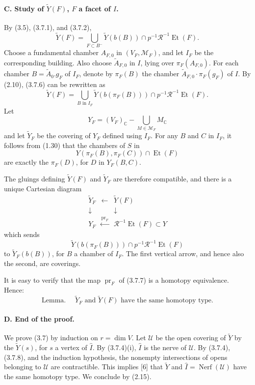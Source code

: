\documentclass[10pt]{article}
\newcommand{\C}{\mathbb C}
\begin{document}
\paragraph{C. Study of \(\widetilde Y(F)\), \(F\) a facet of \(I\).} By (3.5), (3.7.1), and (3.7.2),
\[
\tag{3.7.6}
\widetilde Y(F)=
\bigcup_{F\subset B^-}
\widetilde Y(b(B))\cap p^{-1}\mathcal R^{-1}\operatorname{Et}(F).
\]
Choose a fundamental chamber \(A_{F,0}\) in \((V_F,\mathcal M_F)\), and let \(I_F\) be the corresponding building. Also choose \(\widetilde A_{F,0}\) in \(I\), lying over \(\pi_F(A_{F,0})\). For each chamber \(B=\widetilde A_0.g_F\) of \(I_F\), denote by \(\pi_F(B)\) the chamber \(\widetilde A_{F,0}\cdot\pi_F(g_F)\) of \(I\). By (2.10), (3.7.6) can be rewritten as
\[
\widetilde Y(F)=
\bigcup_{B\text{ in }I_F}
\widetilde Y(b(\pi_F(B)))\cap p^{-1}\mathcal R^{-1}\operatorname{Et}(F).
\]
Let
\[
Y_F=(V_F)_\C-\bigcup_{M\in\mathcal M_F}M_\C
\]
and let \(\widetilde Y_F\) be the covering of \(Y_F\) defined using \(I_F\). For any \(B\) and \(C\) in \(I_F\), it follows from (1.30) that the chambers of \(S\) in
\[
Y(\pi_F(B),\pi_F(C))\cap\operatorname{Et}(F)
\]
are exactly the \(\pi_F(D)\), for \(D\) in \(Y_F(B,C)\).

The gluings defining \(\widetilde Y(F)\) and \(\widetilde Y_F\) are therefore compatible, and there is a unique Cartesian diagram
\[
\tag{3.7.7}
\begin{array}{ccc}
\widetilde Y_F&\longleftarrow&\widetilde Y(F)\\
\downarrow&&\downarrow\\
Y_F&\xleftarrow{\operatorname{pr}_F}&\mathcal R^{-1}\operatorname{Et}(F)\subset Y
\end{array}
\]
which sends
\[
\widetilde Y(b(\pi_F(B)))\cap p^{-1}\mathcal R^{-1}\operatorname{Et}(F)
\]
to \(\widetilde Y_F(b(B))\), for \(B\) a chamber of \(I_F\). The first vertical arrow, and hence also the second, are coverings.

It is easy to verify that the map \(\operatorname{pr}_F\) of (3.7.7) is a homotopy equivalence. Hence:
\[
\tag{3.7.8}
\text{Lemma. }\quad
\widetilde Y_F\text{ and }\widetilde Y(F)\text{ have the same homotopy type.}
\]

\paragraph{D. End of the proof.} We prove (3.7) by induction on \(r=\dim V\). Let \(\mathcal U\) be the open covering of \(\widetilde Y\) by the \(\widetilde Y(s)\), for \(s\) a vertex of \(\widehat I\). By (3.7.4)(i), \(\widehat I\) is the nerve of \(\mathcal U\). By (3.7.4), (3.7.8), and the induction hypothesis, the nonempty intersections of opens belonging to \(\mathcal U\) are contractible. This implies [6] that \(\widetilde Y\) and \(\widehat I=\operatorname{Nerf}(\mathcal U)\) have the same homotopy type. We conclude by (2.15).
\end{document}
